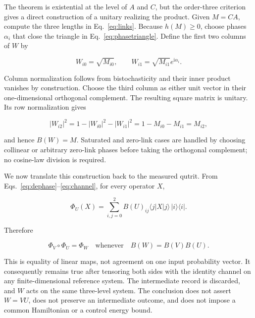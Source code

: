\documentclass[aip,jmp,amsmath,amssymb,preprint,nofootinbib]{revtex4-2}
\begin{document}
The theorem is existential at the level of $A$ and $C$, but the
order-three criterion gives a direct construction of a unitary realizing the
product.  Given $M=CA$, compute the three lengths in Eq.~\eqref{eq:links}.
Because $h(M)\geq0$, choose phases $\alpha_i$ that close the triangle in
Eq.~\eqref{eq:phasetriangle}.  Define the first two columns of $W$ by

\begin{equation}
 W_{i0}=\sqrt{M_{i0}},\qquad
 W_{i1}=\sqrt{M_{i1}}e^{\mathrm{i}\alpha_i}.       \label{eq:Wcolumns}
\end{equation}

Column normalization follows from bistochasticity and their inner product
vanishes by construction.  Choose the third column as either unit vector in
their one-dimensional orthogonal complement.  The resulting square matrix
is unitary.  Its row normalization gives

\begin{equation}
 |W_{i2}|^2=1-|W_{i0}|^2-|W_{i1}|^2
 =1-M_{i0}-M_{i1}=M_{i2},                          \label{eq:thirdmodulus}
\end{equation}

and hence $B(W)=M$.  Saturated and zero-link cases are handled by choosing
collinear or arbitrary zero-link phases before taking the orthogonal
complement; no cosine-law division is required.

We now translate this construction back to the measured qutrit.  From
Eqs.~\eqref{eq:dephase}--\eqref{eq:channel}, for every operator $X$,

\begin{equation}
 \Phi_U(X)=\sum_{i,j=0}^2 B(U)_{ij}
 \langle j|X|j\rangle\,|i\rangle\!\langle i|.     \label{eq:channelmatrix}
\end{equation}

Therefore

\begin{equation}
 \Phi_V\circ\Phi_U=\Phi_W
 \quad\text{whenever}\quad B(W)=B(V)B(U).         \label{eq:channelequality}
\end{equation}

This is equality of linear maps, not agreement on one input probability
vector.  It consequently remains true after tensoring both sides with the
identity channel on any finite-dimensional reference system.  The
intermediate record is discarded, and $W$ acts on the same three-level
system.  The conclusion does not assert $W=VU$, does not preserve an
intermediate outcome, and does not impose a common Hamiltonian or a control
energy bound.
\end{document}
